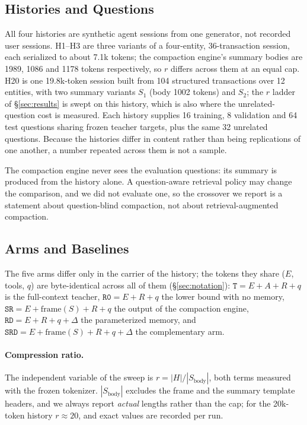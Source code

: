 \documentclass[sigconf,nonacm]{acmart}
\newcommand{\St}{\texttt{SR}}
\newcommand{\Sd}{\texttt{SRD}}
\newcommand{\armT}{\texttt{T}}
\newcommand{\armR}{\texttt{R0}}
\newcommand{\armRD}{\texttt{RD}}
\begin{document}
\subsection{Histories and Questions}\label{sec:histories}

All four histories are synthetic agent sessions from one generator, not recorded user sessions. H1--H3 are
three variants of a four-entity, 36-transaction session, each serialized to about 7.1k tokens; the
compaction engine's summary bodies are 1989, 1086 and 1178 tokens respectively, so $r$ differs across them at
an equal cap. H20 is one 19.8k-token session built from 104 structured transactions over 12 entities, with two
summary variants $S_1$ (body 1002 tokens) and $S_2$; the $r$ ladder of \S\ref{sec:results} is swept on this
history, which is also where the unrelated-question cost is measured. Each history supplies 16 training, 8
validation and 64 test questions sharing frozen teacher targets, plus the same 32 unrelated questions. Because
the histories differ in content rather than being replications of one another, a number repeated across them
is not a sample.

The compaction engine never sees the evaluation questions: its summary is produced from the history alone. A
question-aware retrieval policy may change the comparison, and we did not evaluate one, so the crossover we report
is a statement about question-blind compaction, not about retrieval-augmented compaction.

\subsection{Arms and Baselines}\label{sec:arms}

The five arms differ only in the carrier of the history; the tokens they share ($E$, tools, $q$) are
byte-identical across all of them (\S\ref{sec:notation}): $\armT = E{+}A{+}R{+}q$ is the full-context teacher,
$\armR = E{+}R{+}q$ the lower bound with no memory, $\St = E{+}\mathrm{frame}(S){+}R{+}q$ the output of the
compaction engine, $\armRD = E{+}R{+}q{+}\Delta$ the parameterized memory, and
$\Sd = E{+}\mathrm{frame}(S){+}R{+}q{+}\Delta$ the complementary arm.

\paragraph{Compression ratio.} The independent variable of the sweep is $r=|H|/|S_{\text{body}}|$, both terms
measured with the frozen tokenizer. $|S_{\text{body}}|$ excludes the frame and the summary template headers, and
we always report \emph{actual} lengths rather than the cap; for the 20k-token history $r\approx20$, and exact
values are recorded per run.
\end{document}
